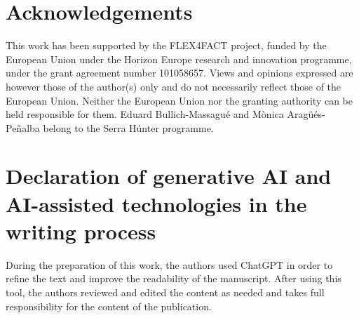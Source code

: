 \documentclass[preprint,12pt]{elsarticle}
\begin{document}
\section*{Acknowledgements}
This work has been supported by the FLEX4FACT project, funded by the European Union under the Horizon Europe research and innovation programme, under the grant agreement number 101058657. Views and opinions expressed are however those of the author(s) only and do not necessarily reflect those of the European Union. Neither the European Union nor the granting authority can be held responsible for them. Eduard Bullich-Massagué and M\`{o}nica Arag\"{u}\'{e}s-Pe\~{n}alba belong to the Serra Húnter programme.



\section*{Declaration of generative AI and AI-assisted technologies in the writing process}
During the preparation of this work, the authors used ChatGPT in order to refine the text and improve the readability of the manuscript. After using this tool, the authors reviewed and edited the content as needed and takes full responsibility for the content of the publication.


\end{document}
